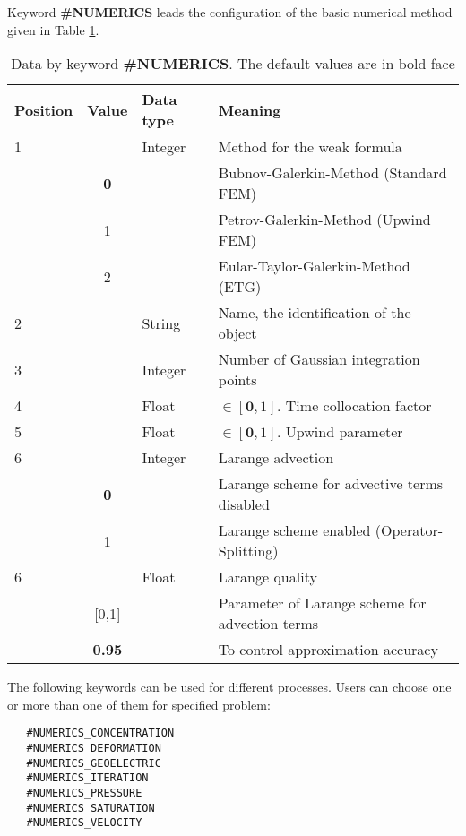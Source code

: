Keyword \textbf{\#NUMERICS} leads the configuration of the basic numerical method given in
Table \ref{tab_num1}.
{\ttfamily
  \small
\begin{table}[htb]
\begin{tabular}{|l|c|l|l|}
  \hline
  Position &Value & Data type & Meaning \\
  \hline
  \hline %
  1 &   &Integer  &Method for the weak formula\\
    & \textbf{0} &  &Bubnov-Galerkin-Method (Standard FEM)\\
    & 1 &         &Petrov-Galerkin-Method (Upwind FEM)\\
    & 2 &         &Eular-Taylor-Galerkin-Method (ETG) \\
  \hline %
   2&   &String &Name, the identification of the object \\
  \hline %
   3&   &Integer &Number of Gaussian integration points\\
  \hline %
   4&   &Float   &$\in [\textbf{0},1]$. Time collocation factor\\
  \hline %
   5&   &Float   &$\in [\textbf{0},1]$. Upwind parameter\\
  \hline %
   6&   & Integer   &Larange advection \\
    &  \textbf{0} &    &Larange scheme for advective terms disabled\\
    &  1 &    &Larange scheme enabled (Operator-Splitting)\\
  \hline %
   6&   & Float   &Larange quality \\
    &  [0,1] &    &Parameter of Larange scheme for advection terms\\
    &  \textbf{0.95} &    &To control approximation accuracy\\
  \hline %
\end{tabular}
\caption{Data by keyword \textbf{\#NUMERICS}.
 The default values are in bold face}
\label{tab_num1}
\end{table}
}



The following keywords can be used for different processes. Users can choose one or more than one of them for
specified problem:
\begin{center}
  \begin{verbatim}
   #NUMERICS_CONCENTRATION
   #NUMERICS_DEFORMATION
   #NUMERICS_GEOELECTRIC
   #NUMERICS_ITERATION
   #NUMERICS_PRESSURE
   #NUMERICS_SATURATION
   #NUMERICS_VELOCITY
 \end{verbatim}
\end{center}

